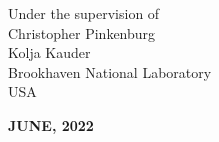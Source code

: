 \begin{titlepage}
\begin{center}
\begin{doublespace}
\begin{comment}
            
        \vspace{1cm}
            {\large
            \textbf{GROUP 2}\\
            \textbf{Sagar Joshi}\\
            \textbf{Siddhant Rathi}\\
            \textbf{Dr. Ankhi Roy}\\
            \textbf{Indian Institute of Technology Indore}\\
            \textbf{INDIA}}
            
\end{comment}

        \vspace{3cm}
        
        Under the supervision of\\
        {\large Christopher Pinkenburg\\
        \large Kolja Kauder\\
        \large Brookhaven National Laboratory\\
        \large USA}
        \end{doublespace}
        \vspace{1cm}
        \begin{figure}[h]
            \centering
            \label{fig:dtulogo}
        \end{figure}
        
        
        
        \vspace{\baselineskip}
        {\large\textbf{JUNE, 2022}}
    \end{center}
\end{titlepage}




